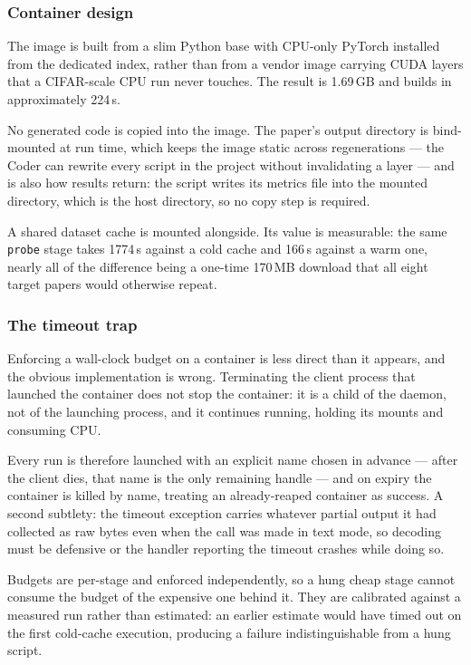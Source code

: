 \documentclass[11pt]{article}
\begin{document}
\subsubsection{Container design}

The image is built from a slim Python base with CPU-only PyTorch installed from the
dedicated index, rather than from a vendor image carrying CUDA layers that a CIFAR-scale
CPU run never touches. The result is 1.69\,GB and builds in approximately 224\,s.

No generated code is copied into the image. The paper's output directory is bind-mounted
at run time, which keeps the image static across regenerations --- the Coder can rewrite
every script in the project without invalidating a layer --- and is also how results
return: the script writes its metrics file into the mounted directory, which is the host
directory, so no copy step is required.

A shared dataset cache is mounted alongside. Its value is measurable: the same
\texttt{probe} stage takes 1774\,s against a cold cache and 166\,s against a warm one,
nearly all of the difference being a one-time 170\,MB download that all eight target
papers would otherwise repeat.

\subsubsection{The timeout trap}

Enforcing a wall-clock budget on a container is less direct than it appears, and the
obvious implementation is wrong. Terminating the client process that launched the
container does not stop the container: it is a child of the daemon, not of the launching
process, and it continues running, holding its mounts and consuming CPU.

Every run is therefore launched with an explicit name chosen in advance --- after the
client dies, that name is the only remaining handle --- and on expiry the container is
killed by name, treating an already-reaped container as success. A second subtlety: the
timeout exception carries whatever partial output it had collected as raw bytes even when
the call was made in text mode, so decoding must be defensive or the handler reporting the
timeout crashes while doing so.

Budgets are per-stage and enforced independently, so a hung cheap stage cannot consume the
budget of the expensive one behind it. They are calibrated against a measured run rather
than estimated: an earlier estimate would have timed out on the first cold-cache execution,
producing a failure indistinguishable from a hung script.
\end{document}
